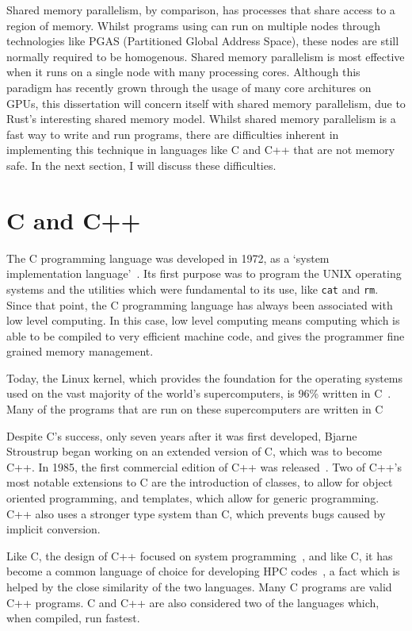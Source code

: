 Shared memory parallelism, by comparison, has processes that share access to a region of memory. Whilst programs using can run on multiple nodes through technologies like PGAS (Partitioned Global Address Space), these nodes are still normally required to be homogenous. Shared memory parallelism is most effective when it runs on a single node with many processing cores. Although this paradigm has recently grown through the usage of many core architures on GPUs, this dissertation will concern itself with shared memory parallelism, due to Rust's interesting shared memory model. Whilst shared memory parallelism is a fast way to write and run programs, there are difficulties inherent in implementing this technique in languages like C and C++ that are not memory safe. In the next section, I will discuss these difficulties.

\section{C and C++}\label{sec:c}
The C programming language was developed in 1972, as a `system implementation language'~\cite{Ritchie:1993}. Its first purpose was to program the UNIX operating systems and the utilities which were fundamental to its use, like \texttt{cat} and \texttt{rm}. Since that point, the C programming language has always been associated with low level computing. In this case, low level computing means computing which is able to be compiled to very efficient machine code, and gives the programmer fine grained memory management.

Today, the Linux kernel, which provides the foundation for the operating systems used on the vast majority of the world's supercomputers, is 96\% written in C~\cite{LinuxKernel}. Many of the programs that are run on these supercomputers are written in C~\cite{fftw, ffs, foam}

Despite C's success, only seven years after it was first developed, Bjarne Stroustrup began working on an extended version of C, which was to become C++. In 1985, the first commercial edition of C++ was released~\cite{CPPFAQS}. Two of C++'s most notable extensions to C are the introduction of classes, to allow for object oriented programming, and templates, which allow for generic programming. C++ also uses a stronger type system than C, which prevents bugs caused by implicit conversion.

Like C, the design of C++ focused on system programming~\cite{CplusEssence}, and like C, it has become a common language of choice for developing HPC codes~\cite{foam}, a fact which is helped by the close similarity of the two languages. Many C programs are valid C++ programs. C and C++ are also considered two of the languages which, when compiled, run fastest.

